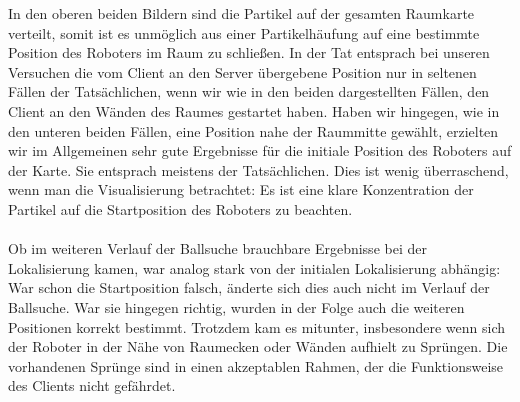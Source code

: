 In den oberen beiden Bildern sind die Partikel auf der gesamten
Raumkarte verteilt, somit ist es unmöglich aus einer Partikelhäufung
auf eine bestimmte Position des Roboters im Raum zu schließen. In der
Tat entsprach bei unseren Versuchen die vom Client an den Server
übergebene Position nur in seltenen Fällen der Tatsächlichen, wenn wir
wie in den beiden dargestellten Fällen, den Client an den Wänden des
Raumes gestartet haben. Haben wir hingegen, wie in den unteren beiden
Fällen, eine Position nahe der Raummitte gewählt, erzielten wir im
Allgemeinen sehr gute Ergebnisse für die initiale Position des
Roboters auf der Karte. Sie entsprach meistens der Tatsächlichen. Dies
ist wenig überraschend, wenn man die Visualisierung betrachtet: Es ist
eine klare Konzentration der Partikel auf die Startposition des
Roboters zu beachten. \\\\
Ob im weiteren Verlauf der Ballsuche brauchbare Ergebnisse bei der
Lokalisierung kamen, war analog stark von der initialen Lokalisierung
abhängig: War schon die Startposition falsch, änderte sich dies
auch nicht im Verlauf der Ballsuche. War sie hingegen richtig, wurden
in der Folge auch die weiteren Positionen korrekt bestimmt. Trotzdem
kam es mitunter, insbesondere wenn sich der Roboter in der Nähe von
Raumecken oder Wänden aufhielt zu Sprüngen. Die 
vorhandenen Sprünge sind in einen akzeptablen Rahmen, der die
Funktionsweise des Clients nicht gefährdet.

